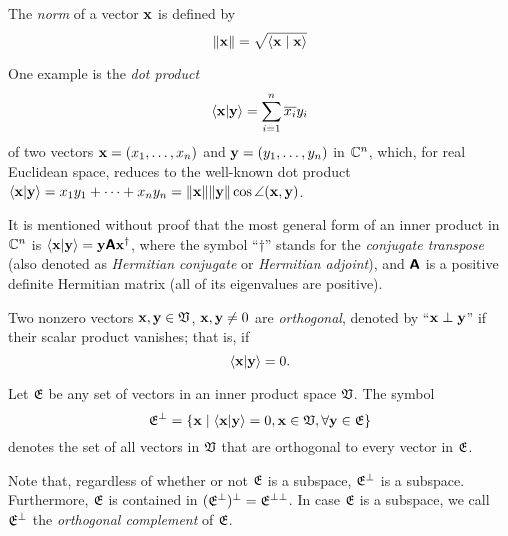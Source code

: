 The {\em norm} of a vector ${\bf x}$
is defined by
\begin{equation}
\|
{\bf x}
\|
=\sqrt{\langle {\bf x}\mid {\bf x}\rangle }
\end{equation}

{
\color{blue}
\bexample
One example is the
{\em dot product}
\begin{equation}
\langle  {\bf x} \vert {\bf y} \rangle
=
\sum_{i=1}^n \overline{x_i}y_i
\end{equation}
of two vectors ${\bf x}=
(x_1,\ldots , x_n)$
and
${\bf y}=
(y_1,\ldots , y_n)$ in ${\Bbb C}^n$,
which, for real Euclidean space,  reduces to the well-known dot product
$\langle  {\bf x} \vert {\bf y} \rangle
=
{x_1}y_1 + \cdots + {x_n}y_n  = \| {\bf x}\| \| {\bf y}\| \cos \angle ({\bf x},{\bf y})$.


It is mentioned without proof that the most general form of an inner product in ${\Bbb C}^n$
is
$\langle  {\bf x} \vert {\bf y} \rangle
=  {\bf y} \textsf{\textbf{A}} {\bf x}^\dagger$,
where the symbol ``$\dagger$'' stands for the {\em conjugate transpose} (also denoted as
{\em Hermitian conjugate} or {\em Hermitian adjoint}),
and $ \textsf{\textbf{A}} $ is a positive definite Hermitian matrix (all of its eigenvalues are positive).
\eexample
}

Two nonzero vectors $  {\bf x} , {\bf y} \in {\frak V}$,  $  {\bf x},   {\bf y}\neq 0$
are {\em orthogonal}, denoted by ``${\bf x} \perp {\bf y}$''
if their scalar product vanishes; that is, if
\begin{equation}
\langle  {\bf x} \vert {\bf y} \rangle   = 0.
\end{equation}


Let ${\frak E}$ be any set of vectors in an inner product space ${\frak V}$.
The symbol
\begin{equation}
{\frak E}^\perp  = \left\{ {\bf x}\mid  \langle  {\bf x} \vert {\bf y} \rangle=0,  {\bf x} \in {\frak V},
\forall {\bf y} \in {\frak E} \right\}
\end{equation}
 denotes the set of all vectors in  ${\frak V}$ that are
orthogonal to every vector in  ${\frak E}$.

Note that, regardless of whether or not ${\frak E}$ is a subspace,
${\frak E}^\perp$ is a subspace.
Furthermore,
${\frak E}$  is contained in $({\frak E}^\perp)^\perp= {\frak E}^{\perp\perp}$.
In case ${\frak E}$ is a subspace, we call ${\frak E}^\perp$
the {\em orthogonal complement}
of ${\frak E}$.

